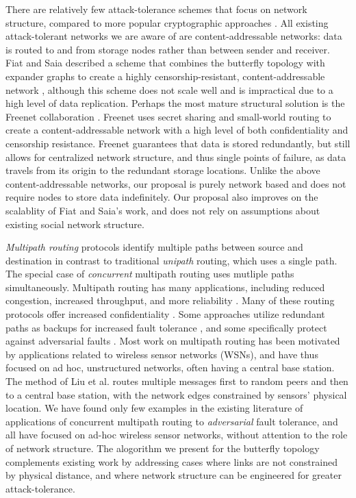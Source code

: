 \documentclass[sigconf]{acmart}
\begin{document}
There are relatively few attack-tolerance schemes
that focus on network structure,
compared to more popular cryptographic approaches
\cite{ferguson_practical_2003}.
All existing attack-tolerant networks we are aware of are content-addressable
networks: data is routed to and from storage nodes rather than between sender
and receiver.
Fiat and Saia described a scheme that combines the butterfly topology
with expander graphs to create a highly censorship-resistant,
content-addressable network \cite{fiat_censorship_2002},
although this scheme does not scale well and is impractical due to a
high level of data replication.
Perhaps the most mature structural solution is the Freenet collaboration
\cite{clarke_freenet:_2001}.
Freenet uses secret sharing
\cite{shamir_how_1979, blakley_safeguarding_1979}
and small-world routing
\cite{zhang_using_2002,kleinberg_small-world_2000}
to create a content-addressable network with a high level of both
confidentiality and censorship resistance.
Freenet guarantees that data is stored redundantly,
but still allows for centralized network structure,
and thus single points of failure,
as data travels from its origin to the redundant storage locations.
Unlike the above content-addressable networks, our proposal is purely network based
and does not require nodes to store data indefinitely.
Our proposal also improves on the scalablity of Fiat and Saia's work,
and does not rely on assumptions about existing social network structure.

{\em Multipath routing} protocols identify multiple paths between
source and destination
in contrast to traditional {\em unipath} routing, which uses
a single path.
The special case of {\em concurrent} multipath routing uses mutliple paths
simultaneously.
Multipath routing has many applications, including reduced congestion,
increased throughput, and more reliability
\cite{qadir_exploiting_2015}.
Many of these routing protocols offer increased confidentiality
\cite{zin_survey_2015}.
Some approaches utilize redundant paths as backups for increased
fault tolerance
\cite{alrajeh_secure_2013},
and some specifically protect against adversarial faults
\cite{kohno_improvement_2012, khalil_unmask:_2010, lou_h-spread:_2006}.
Most work on multipath routing has been motivated by applications related to
wireless sensor networks (WSNs),
and have thus focused on ad hoc, unstructured networks, often having a central
base station.
The method of Liu et al.
\cite{liu_secure_2012}
routes multiple messages first to random peers and then
to a central base station,
with the network edges constrained by sensors' physical location.
We have found only few examples in the existing literature of applications of
concurrent multipath routing to {\em adversarial} fault tolerance,
and all have focused on ad-hoc wireless sensor networks, without attention
to the role of network structure.
The alogorithm we present for the butterfly topology complements existing work
by addressing cases where links are not constrained by physical
distance,
and where network structure can be engineered for greater attack-tolerance.
\end{document}
